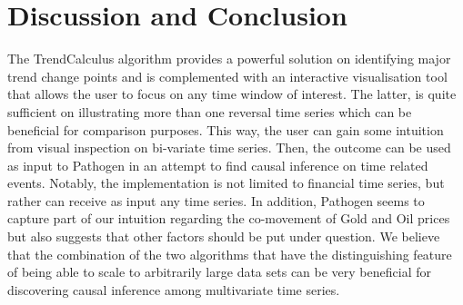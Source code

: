 \documentclass[a4, 11pt]{article}
\begin{document}
\section{Discussion and Conclusion}
The TrendCalculus algorithm provides a powerful solution on identifying major trend change points and is complemented with an interactive visualisation tool that allows the user to focus on any time window of interest. The latter, is quite sufficient on illustrating more than one reversal time series which can be beneficial for comparison purposes. This way, the user can gain some intuition from visual inspection on bi-variate time series. Then, the outcome can be used as input to Pathogen in an attempt to find causal inference on time related events. Notably, the implementation is not limited to financial time series, but rather can receive as input any time series. In addition, Pathogen seems to capture part of our intuition regarding the co-movement of Gold and Oil prices but also suggests that other factors should be put under question. We believe that the combination of the two algorithms that have the distinguishing feature of being able to scale to arbitrarily large data sets can be very beneficial for discovering causal inference among multivariate time series.




\end{document}
